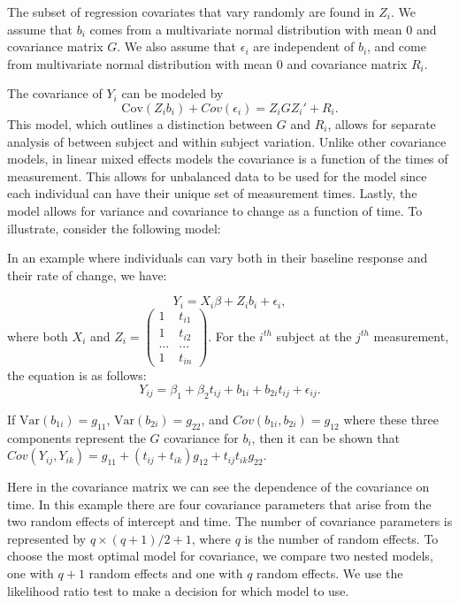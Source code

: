 \documentclass[12pt, twoside]{amherstthesis}
\begin{document}
The subset of regression covariates that vary randomly are found in \(Z_i\). We assume that \(b_i\) comes from a multivariate normal distribution with mean 0 and covariance matrix \(G\). We also assume that \(\epsilon_i\) are independent of \(b_i\), and come from multivariate normal distribution with mean 0 and covariance matrix \(R_i\).

The covariance of \(Y_i\) can be modeled by \[\text{Cov}(Z_ib_i) + Cov(\epsilon_i) = Z_iGZ_i' + R_i.\] This model, which outlines a distinction between \(G\) and \(R_i\), allows for separate analysis of between subject and within subject variation. Unlike other covariance models, in linear mixed effects models the covariance is a function of the times of measurement. This allows for unbalanced data to be used for the model since each individual can have their unique set of measurement times. Lastly, the model allows for variance and covariance to change as a function of time. To illustrate, consider the following model:

In an example where individuals can vary both in their baseline response and their rate of change, we have:

\[Y_i = X_i\beta+Z_ib_i+\epsilon_i,\] where both \(X_i\) and \(Z_i = \begin{pmatrix} 1 & t_{i1} \\ 1 & t_{i2} \\ ... & ... \\ 1 & t_{in}\end{pmatrix}\). For the \(i^{th}\) subject at the \(j^{th}\) measurement, the equation is as follows: \[Y_{ij} = \beta_1 + \beta_2t_{ij} +b_{1i} + b_{2i}t_{ij} + \epsilon_{ij}.\]

If \(\text{Var}(b_{1i}) = g_{11}\), \(\text{Var}(b_{2i}) = g_{22}\), and \(Cov(b_{1i},b_{2i}) = g_{12}\) where these three components represent the \(G\) covariance for \(b_i\), then
it can be shown that \(Cov(Y_{ij}, Y_{ik}) = g_{11} + (t_{ij} + t_{ik})g_{12} + t_{ij}t_{ik}g_{22}\).

Here in the covariance matrix we can see the dependence of the covariance on time. In this example there are four covariance parameters that arise from the two random effects of intercept and time. The number of covariance parameters is represented by \(q \times (q+1)/2 + 1\), where \(q\) is the number of random effects. To choose the most optimal model for covariance, we compare two nested models, one with \(q+1\) random effects and one with \(q\) random effects. We use the likelihood ratio test to make a decision for which model to use.
\end{document}
